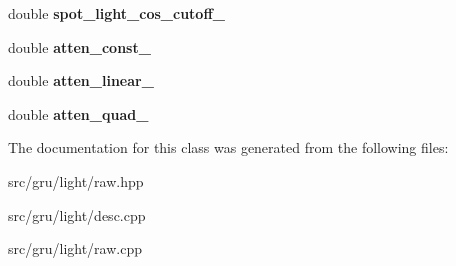\begin{DoxyCompactItemize}
\item 
\hypertarget{classglutpp_1_1light_1_1raw_a0d0cdb6db2721483f12bee0dc1f63eb0}{double {\bfseries spot\-\_\-light\-\_\-cos\-\_\-cutoff\-\_\-}}\label{classglutpp_1_1light_1_1raw_a0d0cdb6db2721483f12bee0dc1f63eb0}

\item 
\hypertarget{classglutpp_1_1light_1_1raw_ac74fe4904b037eac04b7b6dcc397f01a}{double {\bfseries atten\-\_\-const\-\_\-}}\label{classglutpp_1_1light_1_1raw_ac74fe4904b037eac04b7b6dcc397f01a}

\item 
\hypertarget{classglutpp_1_1light_1_1raw_a1092ff2401dac4849e20652fc5223d76}{double {\bfseries atten\-\_\-linear\-\_\-}}\label{classglutpp_1_1light_1_1raw_a1092ff2401dac4849e20652fc5223d76}

\item 
\hypertarget{classglutpp_1_1light_1_1raw_a4195d675298045abd04ccf3c3317c55a}{double {\bfseries atten\-\_\-quad\-\_\-}}\label{classglutpp_1_1light_1_1raw_a4195d675298045abd04ccf3c3317c55a}

\end{DoxyCompactItemize}


\-The documentation for this class was generated from the following files\-:\begin{DoxyCompactItemize}
\item 
src/gru/light/raw.\-hpp\item 
src/gru/light/desc.\-cpp\item 
src/gru/light/raw.\-cpp\end{DoxyCompactItemize}
